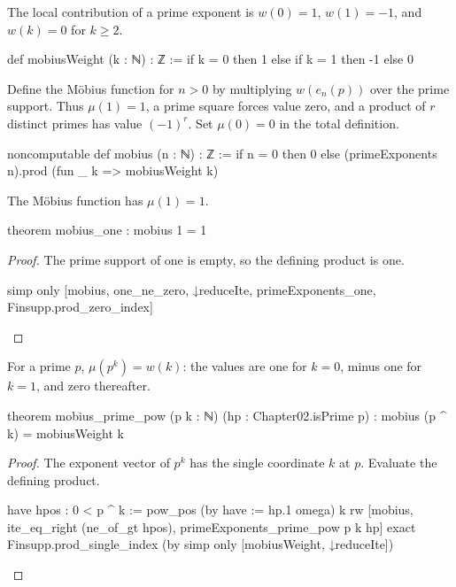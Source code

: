 \begin{definition}
  The local contribution of a prime exponent is $w(0)=1$, $w(1)=-1$, and $w(k)=0$ for $k\ge2$.

  \begin{lean}
    def mobiusWeight (k : ℕ) : ℤ := if k = 0 then 1 else if k = 1 then -1 else 0
  \end{lean}
\end{definition}

\begin{definition}
  Define the M\"obius function for $n>0$ by multiplying $w(e_n(p))$ over the prime support.
  Thus $\mu(1)=1$, a prime square forces value zero, and a product of $r$ distinct primes has value
  $(-1)^r$.
  Set $\mu(0)=0$ in the total definition.

  \begin{lean}
    noncomputable def mobius (n : ℕ) : ℤ :=
      if n = 0 then 0 else (primeExponents n).prod (fun _ k => mobiusWeight k)
  \end{lean}
\end{definition}

\begin{theorem}
  \label{ent:thm:mobius-one}
  The M\"obius function has $\mu(1)=1$.

  \begin{lean}
    theorem mobius_one : mobius 1 = 1
  \end{lean}
\end{theorem}

\begin{proof}
  The prime support of one is empty, so the defining product is one.

  \begin{lean}
    simp only [mobius, one_ne_zero, ↓reduceIte, primeExponents_one, Finsupp.prod_zero_index]
  \end{lean}
\end{proof}

\begin{theorem}
  \label{ent:thm:mobius-prime-pow}
  For a prime $p$, $\mu(p^k)=w(k)$: the values are one for $k=0$, minus one for $k=1$, and zero
  thereafter.

  \begin{lean}
    theorem mobius_prime_pow (p k : ℕ) (hp : Chapter02.isPrime p) :
        mobius (p ^ k) = mobiusWeight k
  \end{lean}
\end{theorem}

\begin{proof}
  The exponent vector of $p^k$ has the single coordinate $k$ at $p$.
  Evaluate the defining product.

  \begin{lean}
    have hpos : 0 < p ^ k := pow_pos (by
        have := hp.1
        omega) k
    rw [mobius, ite_eq_right (ne_of_gt hpos), primeExponents_prime_pow p k hp]
    exact Finsupp.prod_single_index (by simp only [mobiusWeight, ↓reduceIte])
  \end{lean}
\end{proof}

